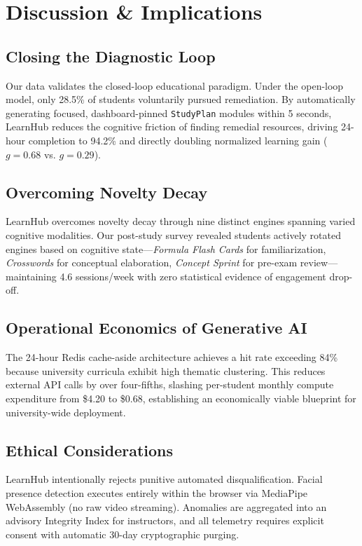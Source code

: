 \documentclass[journal]{IEEEtran}
\begin{document}
\section{Discussion \& Implications}
\label{sec:discussion}
\subsection{Closing the Diagnostic Loop}
Our data validates the closed-loop educational paradigm. Under the open-loop model, only 28.5\% of students voluntarily pursued remediation. By automatically generating focused, dashboard-pinned \texttt{StudyPlan} modules within 5 seconds, LearnHub reduces the cognitive friction of finding remedial resources, driving 24-hour completion to 94.2\% and directly doubling normalized learning gain ($g = 0.68$ vs. $g = 0.29$).

\subsection{Overcoming Novelty Decay}
LearnHub overcomes novelty decay through nine distinct engines spanning varied cognitive modalities. Our post-study survey revealed students actively rotated engines based on cognitive state---\emph{Formula Flash Cards} for familiarization, \emph{Crosswords} for conceptual elaboration, \emph{Concept Sprint} for pre-exam review---maintaining 4.6 sessions/week with zero statistical evidence of engagement drop-off.

\subsection{Operational Economics of Generative AI}
The 24-hour Redis cache-aside architecture achieves a hit rate exceeding 84\% because university curricula exhibit high thematic clustering. This reduces external API calls by over four-fifths, slashing per-student monthly compute expenditure from \$4.20 to \$0.68, establishing an economically viable blueprint for university-wide deployment.

\subsection{Ethical Considerations}
LearnHub intentionally rejects punitive automated disqualification. Facial presence detection executes entirely within the browser via MediaPipe WebAssembly (no raw video streaming). Anomalies are aggregated into an advisory Integrity Index for instructors, and all telemetry requires explicit consent with automatic 30-day cryptographic purging.
\end{document}
